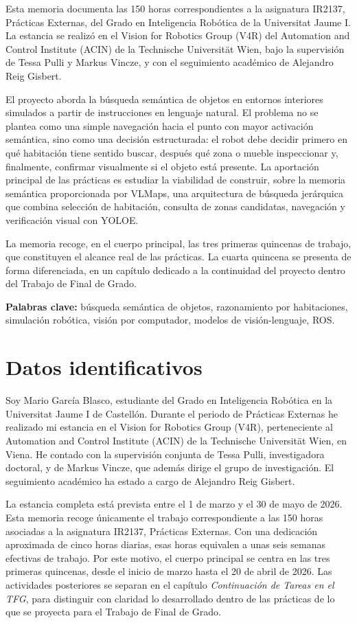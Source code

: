 \documentclass[11pt,fleqn,openany]{book} %
\begin{document}
Esta memoria documenta las 150 horas correspondientes a la asignatura IR2137, Prácticas Externas, del Grado en Inteligencia Robótica de la Universitat Jaume I. La estancia se realizó en el Vision for Robotics Group (V4R) del Automation and Control Institute (ACIN) de la Technische Universität Wien, bajo la supervisión de Tessa Pulli y Markus Vincze, y con el seguimiento académico de Alejandro Reig Gisbert.

El proyecto aborda la búsqueda semántica de objetos en entornos interiores simulados a partir de instrucciones en lenguaje natural. El problema no se plantea como una simple navegación hacia el punto con mayor activación semántica, sino como una decisión estructurada: el robot debe decidir primero en qué habitación tiene sentido buscar, después qué zona o mueble inspeccionar y, finalmente, confirmar visualmente si el objeto está presente. La aportación principal de las prácticas es estudiar la viabilidad de construir, sobre la memoria semántica proporcionada por VLMaps, una arquitectura de búsqueda jerárquica que combina selección de habitación, consulta de zonas candidatas, navegación y verificación visual con YOLOE.

La memoria recoge, en el cuerpo principal, las tres primeras quincenas de trabajo, que constituyen el alcance real de las prácticas. La cuarta quincena se presenta de forma diferenciada, en un capítulo dedicado a la continuidad del proyecto dentro del Trabajo de Final de Grado.

\medskip
\noindent\textbf{Palabras clave:} búsqueda semántica de objetos, razonamiento por habitaciones, simulación robótica, visión por computador, modelos de visión-lenguaje, ROS.

\section{Datos identificativos}

Soy Mario García Blasco, estudiante del Grado en Inteligencia Robótica en la Universitat Jaume I de Castellón. Durante el periodo de Prácticas Externas he realizado mi estancia en el Vision for Robotics Group (V4R), perteneciente al Automation and Control Institute (ACIN) de la Technische Universität Wien, en Viena. He contado con la supervisión conjunta de Tessa Pulli, investigadora doctoral, y de Markus Vincze, que además dirige el grupo de investigación. El seguimiento académico ha estado a cargo de Alejandro Reig Gisbert.

La estancia completa está prevista entre el 1 de marzo y el 30 de mayo de 2026. Esta memoria recoge únicamente el trabajo correspondiente a las 150 horas asociadas a la asignatura IR2137, Prácticas Externas. Con una dedicación aproximada de cinco horas diarias, esas horas equivalen a unas seis semanas efectivas de trabajo. Por este motivo, el cuerpo principal se centra en las tres primeras quincenas, desde el inicio de marzo hasta el 20 de abril de 2026. Las actividades posteriores se separan en el capítulo \emph{Continuación de Tareas en el TFG}, para distinguir con claridad lo desarrollado dentro de las prácticas de lo que se proyecta para el Trabajo de Final de Grado.
\end{document}
